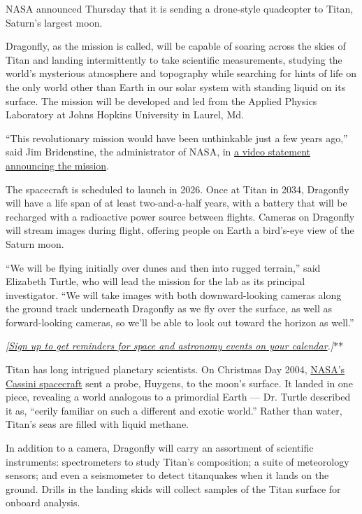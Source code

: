 NASA announced Thursday that it is sending a drone-style quadcopter to
Titan, Saturn's largest moon.

Dragonfly, as the mission is called, will be capable of soaring across
the skies of Titan and landing intermittently to take scientific
measurements, studying the world's mysterious atmosphere and topography
while searching for hints of life on the only world other than Earth in
our solar system with standing liquid on its surface. The mission will
be developed and led from the Applied Physics Laboratory at Johns
Hopkins University in Laurel, Md.

``This revolutionary mission would have been unthinkable just a few
years ago,'' said Jim Bridenstine, the administrator of NASA, in
\href{https://twitter.com/JimBridenstine/status/1144334797101260800}{a
video statement announcing the mission}.

The spacecraft is scheduled to launch in 2026. Once at Titan in 2034,
Dragonfly will have a life span of at least two-and-a-half years, with a
battery that will be recharged with a radioactive power source between
flights. Cameras on Dragonfly will stream images during flight, offering
people on Earth a bird's-eye view of the Saturn moon.

``We will be flying initially over dunes and then into rugged terrain,''
said Elizabeth Turtle, who will lead the mission for the lab as its
principal investigator. ``We will take images with both downward-looking
cameras along the ground track underneath Dragonfly as we fly over the
surface, as well as forward-looking cameras, so we'll be able to look
out toward the horizon as well.''

\emph{\emph{\emph{{[}}\href{https://www.nytimes3xbfgragh.onion/interactive/2019/science/astronomy-space-calendar.html}{\emph{Sign
up to get reminders for space and astronomy events on your
calendar}}}.{]}}**

Titan has long intrigued planetary scientists. On Christmas Day 2004,
\href{https://www.nytimes3xbfgragh.onion/interactive/2017/09/14/science/cassini-saturn-images.html}{NASA's
Cassini spacecraft} sent a probe, Huygens, to the moon's surface. It
landed in one piece, revealing a world analogous to a primordial Earth
--- Dr. Turtle described it as, ``eerily familiar on such a different
and exotic world.'' Rather than water, Titan's seas are filled with
liquid methane.

In addition to a camera, Dragonfly will carry an assortment of
scientific instruments: spectrometers to study Titan's composition; a
suite of meteorology sensors; and even a seismometer to detect
titanquakes when it lands on the ground. Drills in the landing skids
will collect samples of the Titan surface for onboard analysis.

